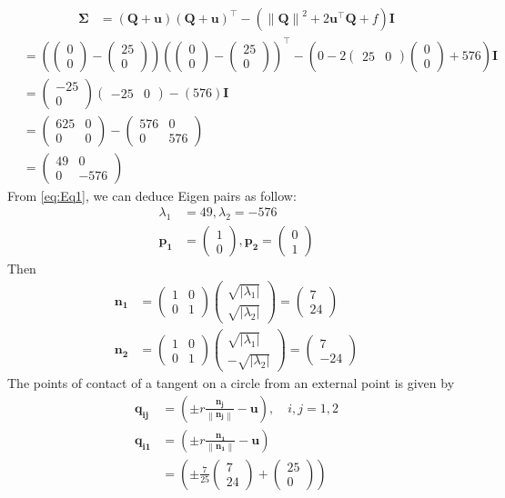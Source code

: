 \documentclass[12pt]{article}
\providecommand{\brak}[1]{\ensuremath{\left(#1\right)}}
\providecommand{\norm}[1]{\left\lVert#1\right\rVert}
\providecommand{\abs}[1]{\left\vert#1\right\vert}
\newcommand{\myvec}[1]{\ensuremath{\begin{pmatrix}#1\end{pmatrix}}}
\let\vec\mathbf
\begin{document}
\begin{enumerate}
\begin{align}
	\vec{\Sigma} &= \brak{\vec{Q}+\vec{u}}\brak{\vec{Q}+\vec{u}}^\top - \brak{\norm{\vec{Q}}^2+2\vec{u}^\top\vec{Q}+f}\vec{I}
\end{align}
\begin{align}
	&= \brak{\myvec{0 \\0}-\myvec{25 \\ 0}}\brak{\myvec{0 \\ 0}-\myvec{25 \\0}}^\top - \brak{0-2\myvec{25 & 0}\myvec{0 \\0}+576}\vec{I} \\ 
	&= \myvec{-25 \\0}\myvec{-25 & 0} - \brak{576}\vec{I} \\ 
	&= \myvec{625 & 0 \\ 0 & 0 } - \myvec{576 & 0 \\ 0 & 576} \\ 
        \label{eq:Eq1}
	&= \myvec{49 & 0 \\ 0 & -576 } 
\end{align}
From \eqref{eq:Eq1}, we can deduce Eigen pairs as follow: 
\begin{align}
	\lambda_1 &= 49 , \lambda_2 = -576 \\
	\vec{p_1} &= \myvec{1 \\ 0} , \vec{p_2} = \myvec{0 \\ 1}
\end{align}
Then
\begin{align}
	\vec{n_1} &= \myvec{1 & 0 \\ 0 & 1}\myvec{\sqrt{\abs{\lambda_1}} \\ \sqrt{\abs{\lambda_2}}} = \myvec{7 \\ 24} \\
	\vec{n_2} &= \myvec{1 & 0 \\ 0 & 1}\myvec{\sqrt{\abs{\lambda_1}} \\ -\sqrt{\abs{\lambda_2}}} = \myvec{7 \\ -24}
\end{align}
The points of contact of a tangent on a circle from an external point is given by 
\begin{align}
	\vec{q_{ij}} &= \brak{\pm r \frac{\vec{n_j}}{\norm{\vec{n_j}}}- \vec{u}},  \quad i,j = 1,2 \\
	\vec{q_{i1}} &= \brak{\pm r \frac{\vec{n_1}}{\norm{\vec{n_1}}}- \vec{u}} \\
	&= \brak{\pm \frac{7}{25}\myvec{7 \\ 24}+ \myvec{25 \\ 0}} \\

\end{align}
\end{enumerate}
\end{document}
